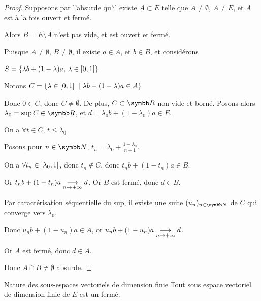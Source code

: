 \begin{proof}
    Supposons par l'absurde qu'il existe $A \subset E$ telle que $A \neq \emptyset$, $A \neq E$, et $A$ est à la fois ouvert et fermé.

    Alors $B = E \setminus A$ n'est pas vide, et est ouvert et fermé. 

    Puisque $A \neq \emptyset, \, B \neq \emptyset$, il existe $a \in A$, et $b \in B$, 
    et considérons 
    
    $S = \left\{\lambda b + (1 - \lambda )a, \, \lambda \in \left[0, 1\right]\right\}$

    Notons $C = \left\{\lambda \in \inter 0 1 \ \mid \lambda b + (1 - \lambda )a \in A\right\}$

    Donc $0 \in C$, donc $C \neq \emptyset$.
    De plus, $C \subset \R$ non vide et borné. Posons alors $\lambda_0 = \sup C \in \R$, et 
    $d = \lambda_0 b + (1 - \lambda_0)a \in E$.

    On a $\forall t \in C, \, t \leqslant \lambda_0$

    Posons pour $\displaystyle n \in \N$, $\displaystyle t_n = \lambda_0 + \frac{1 - \lambda_0}{n + 1}$. 

    On a $\forall t_n \in \left]\lambda_0, 1\right]$, donc $t_n \not \in C$, donc $t_n b + (1 - t_n)a \in B$.

    Or $t_n b + (1 - t_n)a \underset{n \to + \infty}{\longrightarrow} d$. Or $B$ est fermé, donc $d \in B$.

    Par caractérisation séquentielle du sup, il existe une suite $(u_n)_{n \in \N}$ de $C$ qui converge 
    vers $\lambda_0$.

    Donc $u_n b + (1 - u_n)a \in A$, or $u_n b + (1 - u_n)a \underset{n \to + \infty}{\longrightarrow} d$.

    Or $A$ est fermé, donc $d \in A$.

    Donc $A \cap B \neq \emptyset$ absurde.
\end{proof}

\begin{theoreme}{Nature des sous-espaces vectoriels de dimension finie}{}
    Tout sous espace vectoriel de dimension finie de $E$ est un fermé. 
\end{theoreme}


